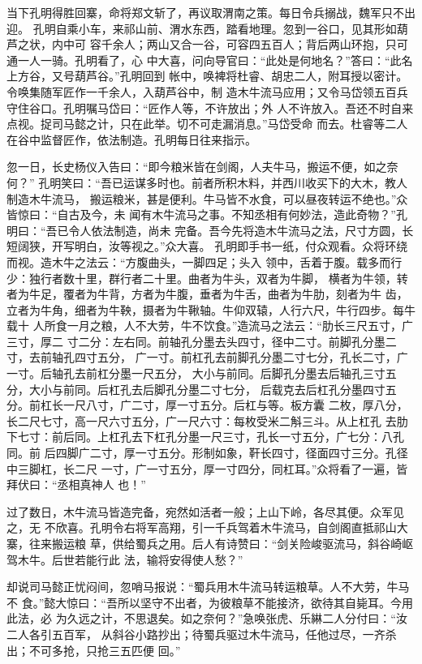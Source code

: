 当下孔明得胜回寨，命将郑文斩了，再议取渭南之策。每日令兵搦战，魏军只不出迎。
孔明自乘小车，来祁山前、渭水东西，踏看地理。忽到一谷口，见其形如葫芦之状，内中可
容千余人；两山又合一谷，可容四五百人；背后两山环抱，只可通一人一骑。孔明看了，心
中大喜，问向导官曰：“此处是何地名？”答曰：“此名上方谷，又号葫芦谷。”孔明回到
帐中，唤裨将杜睿、胡忠二人，附耳授以密计。令唤集随军匠作一千余人，入葫芦谷中，制
造木牛流马应用；又令马岱领五百兵守住谷口。孔明嘱马岱曰：“匠作人等，不许放出；外
人不许放入。吾还不时自来点视。捉司马懿之计，只在此举。切不可走漏消息。”马岱受命
而去。杜睿等二人在谷中监督匠作，依法制造。孔明每日往来指示。

忽一日，长史杨仪入告曰：“即今粮米皆在剑阁，人夫牛马，搬运不便，如之奈何？”
孔明笑曰：“吾已运谋多时也。前者所积木料，并西川收买下的大木，教人制造木牛流马，
搬运粮米，甚是便利。牛马皆不水食，可以昼夜转运不绝也。”众皆惊曰：“自古及今，未
闻有木牛流马之事。不知丞相有何妙法，造此奇物？”孔明曰：“吾已令人依法制造，尚未
完备。吾今先将造木牛流马之法，尺寸方圆，长短阔狭，开写明白，汝等视之。”众大喜。
孔明即手书一纸，付众观看。众将环绕而视。造木牛之法云：“方腹曲头，一脚四足；头入
领中，舌着于腹。载多而行少：独行者数十里，群行者二十里。曲者为牛头，双者为牛脚，
横者为牛领，转者为牛足，覆者为牛背，方者为牛腹，垂者为牛舌，曲者为牛肋，刻者为牛
齿，立者为牛角，细者为牛鞅，摄者为牛鞦轴。牛仰双辕，人行六尺，牛行四步。每牛载十
人所食一月之粮，人不大劳，牛不饮食。”造流马之法云：“肋长三尺五寸，广三寸，厚二
寸二分：左右同。前轴孔分墨去头四寸，径中二寸。前脚孔分墨二寸，去前轴孔四寸五分，
广一寸。前杠孔去前脚孔分墨二寸七分，孔长二寸，广一寸。后轴孔去前杠分墨一尺五分，
大小与前同。后脚孔分墨去后轴孔三寸五分，大小与前同。后杠孔去后脚孔分墨二寸七分，
后载克去后杠孔分墨四寸五分。前杠长一尺八寸，广二寸，厚一寸五分。后杠与等。板方囊
二枚，厚八分，长二尺七寸，高一尺六寸五分，广一尺六寸：每枚受米二斛三斗。从上杠孔
去肋下七寸：前后同。上杠孔去下杠孔分墨一尺三寸，孔长一寸五分，广七分：八孔同。前
后四脚广二寸，厚一寸五分。形制如象，靬长四寸，径面四寸三分。孔径中三脚杠，长二尺
一寸，广一寸五分，厚一寸四分，同杠耳。”众将看了一遍，皆拜伏曰：“丞相真神人
也！”

过了数日，木牛流马皆造完备，宛然如活者一般；上山下岭，各尽其便。众军见之，无
不欣喜。孔明令右将军高翔，引一千兵驾着木牛流马，自剑阁直抵祁山大寨，往来搬运粮
草，供给蜀兵之用。后人有诗赞曰：“剑关险峻驱流马，斜谷崎岖驾木牛。后世若能行此
法，输将安得使人愁？”

却说司马懿正忧闷间，忽哨马报说：“蜀兵用木牛流马转运粮草。人不大劳，牛马不
食。”懿大惊曰：“吾所以坚守不出者，为彼粮草不能接济，欲待其自毙耳。今用此法，必
为久远之计，不思退矣。如之奈何？”急唤张虎、乐綝二人分付曰：“汝二人各引五百军，
从斜谷小路抄出；待蜀兵驱过木牛流马，任他过尽，一齐杀出；不可多抢，只抢三五匹便
回。”

